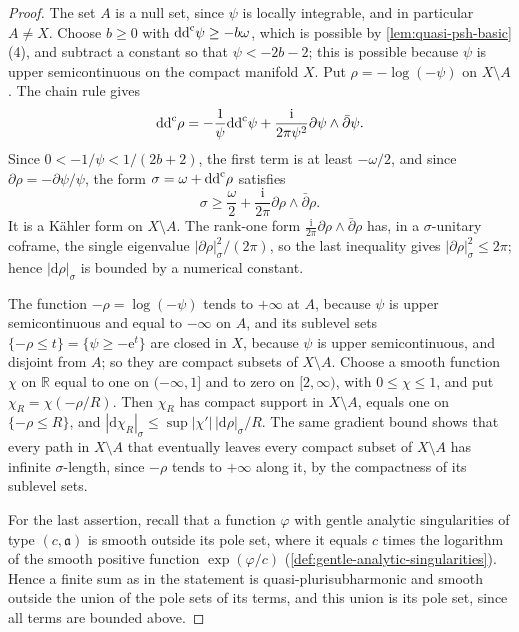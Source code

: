\begin{proof}
The set $A$ is a null set, since $\psi$ is locally integrable, and in particular $A\neq X$. Choose $b\geq0$ with $\mathrm{dd}^{\mathrm{c}}\psi\geq-b\omega$, which is possible by \cref{lem:quasi-psh-basic}(4), and subtract a constant so that $\psi<-2b-2$; this is possible because $\psi$ is upper semicontinuous on the compact manifold $X$. Put $\rho=-\log(-\psi)$ on $X\setminus A$. The chain rule gives
\[
 \mathrm{dd}^{\mathrm{c}}\rho=-\frac1\psi\mathrm{dd}^{\mathrm{c}}\psi+
       \frac{\mathrm i}{2\pi\psi^2}\partial\psi\wedge\bar\partial\psi.
\]
Since $0<-1/\psi<1/(2b+2)$, the first term is at least $-\omega/2$, and since $\partial\rho=-\partial\psi/\psi$, the form $\sigma=\omega+\mathrm{dd}^{\mathrm{c}}\rho$ satisfies
\[
 \sigma\geq\frac\omega2+\frac{\mathrm i}{2\pi}\partial\rho\wedge\bar\partial\rho.
\]
It is a K\"ahler form on $X\setminus A$. The rank-one form $\frac{\mathrm i}{2\pi}\partial\rho\wedge\bar\partial\rho$ has, in a $\sigma$-unitary coframe, the single eigenvalue $|\partial\rho|_\sigma^2/(2\pi)$, so the last inequality gives $|\partial\rho|_\sigma^2\leq2\pi$; hence $|\mathrm d\rho|_\sigma$ is bounded by a numerical constant.

The function $-\rho=\log(-\psi)$ tends to $+\infty$ at $A$, because $\psi$ is upper semicontinuous and equal to $-\infty$ on $A$, and its sublevel sets $\{-\rho\leq t\}=\{\psi\geq-\mathrm e^t\}$ are closed in $X$, because $\psi$ is upper semicontinuous, and disjoint from $A$; so they are compact subsets of $X\setminus A$. Choose a smooth function $\chi$ on $\mathbb R$ equal to one on $(-\infty,1]$ and to zero on $[2,\infty)$, with $0\leq\chi\leq1$, and put $\chi_R=\chi(-\rho/R)$. Then $\chi_R$ has compact support in $X\setminus A$, equals one on $\{-\rho\leq R\}$, and $|\mathrm d\chi_R|_\sigma\leq\sup|\chi'|\,|\mathrm d\rho|_\sigma/R$. The same gradient bound shows that every path in $X\setminus A$ that eventually leaves every compact subset of $X\setminus A$ has infinite $\sigma$-length, since $-\rho$ tends to $+\infty$ along it, by the compactness of its sublevel sets.

For the last assertion, recall that a function $\varphi$ with gentle analytic singularities of type $(c,\mathfrak a)$ is smooth outside its pole set, where it equals $c$ times the logarithm of the smooth positive function $\exp(\varphi/c)$ (\cref{def:gentle-analytic-singularities}). Hence a finite sum as in the statement is quasi-plurisubharmonic and smooth outside the union of the pole sets of its terms, and this union is its pole set, since all terms are bounded above.
\end{proof}

